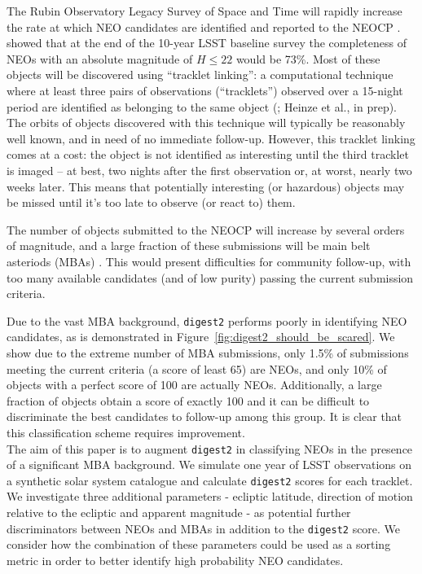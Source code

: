 \documentclass[twocolumn, twocolappendix]{aastex631}
\newcommand{\dig}{\texttt{digest2}}
\begin{document}
The Rubin Observatory Legacy Survey of Space and Time \citep[LSST,][]{Ivezic+2019} will rapidly increase the rate at which NEO candidates are identified and reported to the NEOCP \citep{sky-is-falling}. \citet{Jones+2018} showed that at the end of the 10-year LSST baseline survey the completeness of NEOs with an absolute magnitude of $H \le 22$ would be 73\%. Most of these objects will be discovered using ``tracklet linking'': a computational technique where at least three pairs of observations (``tracklets'') observed over a 15-night period are identified as belonging to the same object (\citealp{Juric+2017}; Heinze et al., in prep). The orbits of objects discovered with this technique will typically be reasonably well known, and in need of no immediate follow-up. However, this tracklet linking comes at a cost: the object is not identified as interesting until the third tracklet is imaged -- at best, two nights after the first observation or, at worst, nearly two weeks later. This means that potentially interesting (or hazardous) objects may be missed until it's too late to observe (or react to) them.

The number of objects submitted to the NEOCP will increase by several orders of magnitude, and a large fraction of these submissions will be main belt asteriods (MBAs) \citep{sky-is-falling}. This would present difficulties for community follow-up, with too many available candidates (and of low purity) passing the current submission criteria.

Due to the vast MBA background, \dig{} performs poorly in identifying NEO candidates, as is demonstrated in Figure~\ref{fig:digest2_should_be_scared}. We show due to the extreme number of MBA submissions, only 1.5\% of submissions meeting the current criteria (a score of least 65) are NEOs, and only 10\% of objects with a perfect score of 100 are actually NEOs. Additionally, a large fraction of objects obtain a score of exactly 100 and it can be difficult to discriminate the best candidates to follow-up among this group. It is clear that this classification scheme requires improvement.
\\

The aim of this paper is to augment \dig{} in classifying NEOs in the presence of a significant MBA background. We simulate one year of LSST observations on a synthetic solar system catalogue and calculate \dig{} scores for each tracklet. We investigate three additional parameters - ecliptic latitude, direction of motion relative to the ecliptic and apparent magnitude - as potential further discriminators between NEOs and MBAs in addition to the \dig{} score. We consider how the combination of these parameters could be used as a sorting metric in order to better identify high probability NEO candidates.
\end{document}
